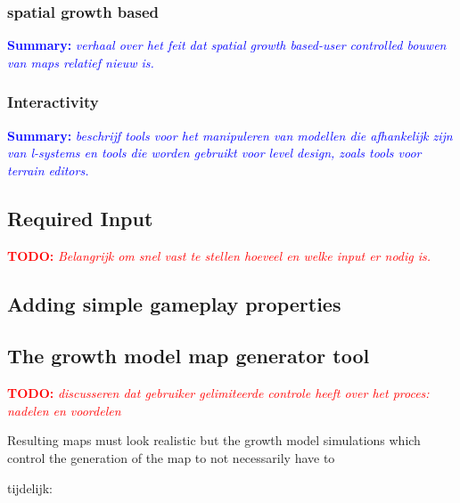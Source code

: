 \documentclass{article}
\newcommand{\todo}[1]{\textcolor{red}{\textbf{\newline TODO: }\it{#1} \newline}}
\newcommand{\inhoud}[1]{\textcolor{blue}{\textbf{\newline Summary: }\it{#1}}}
\begin{document}
\subsubsection{spatial growth based}
\inhoud{verhaal over het feit dat spatial growth based-user controlled bouwen van maps relatief nieuw is.}

\subsubsection{Interactivity}
\inhoud{beschrijf tools voor het manipuleren van modellen die afhankelijk zijn van l-systems en tools die worden 
	gebruikt voor level design, zoals tools voor terrain editors.}


\subsection{Required Input}
\todo{Belangrijk om snel vast te stellen hoeveel en welke input er nodig is.}



\subsection{Adding simple gameplay properties}

\subsection{The growth model map generator tool}
\todo{discusseren dat gebruiker gelimiteerde controle heeft over het proces: nadelen en voordelen}


Resulting maps must look realistic but the growth model simulations which control the generation of the map to not necessarily have to       


tijdelijk: 
\end{document}
